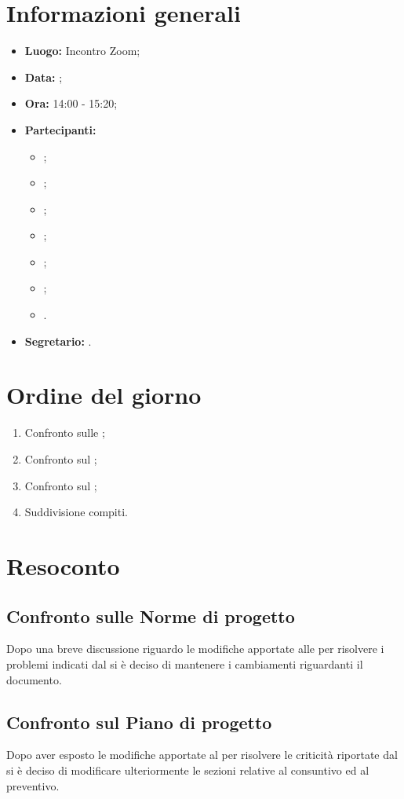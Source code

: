 \section{Informazioni generali}
\begin{itemize}
	\item \textbf{Luogo:} Incontro Zoom;
	\item \textbf{Data:} \Data;
	\item \textbf{Ora:} 14:00 - 15:20;
	\item \textbf{Partecipanti:}
	\begin{itemize}
		\item \BL{}; 
		\item \FF{};
		\item \MM{}; 
		\item \PC{};
		\item \TG{};
		\item \TL{};
		\item \VD{}.
	\end{itemize} 
	\item \textbf{Segretario:} \PC{}.
\end{itemize}

\section{Ordine del giorno}
\begin{enumerate}
	\item Confronto sulle \NdP{};
	\item Confronto sul \PdP{};
	\item Confronto sul \PdQ{};
	\item Suddivisione compiti.
\end{enumerate}

\section{Resoconto}
\subsection{Confronto sulle Norme di progetto}
Dopo una breve discussione riguardo le modifiche apportate alle \NdP{} per risolvere i problemi indicati dal \VT{} si è deciso di mantenere i cambiamenti riguardanti il documento.
\subsection{Confronto sul Piano di progetto}
Dopo aver esposto le modifiche apportate al \PdP{} per risolvere le criticità riportate dal \VT{} si è deciso di modificare ulteriormente le sezioni relative al consuntivo ed al preventivo.

